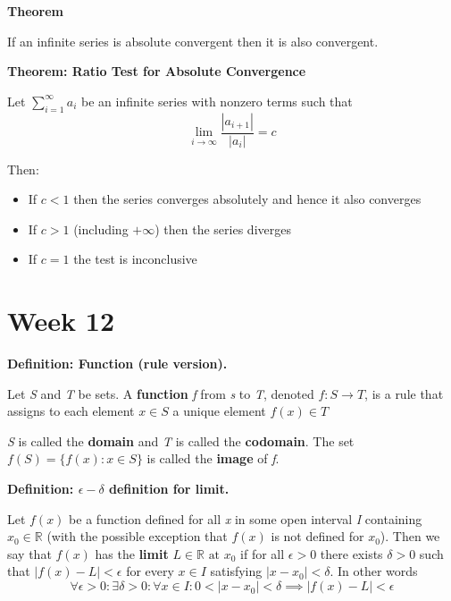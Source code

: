 \documentclass{article}
\newcommand*{\R}{\mathbb{R}}
\begin{document}
\vspace{\baselineskip}
\textbf{Theorem}

If an infinite series is absolute convergent then it is also convergent.

\vspace{\baselineskip}
\textbf{Theorem: Ratio Test for Absolute Convergence}

Let \(\sum^{\infty}_{i=1}a_i\) be an infinite series with nonzero terms such that
\begin{equation}
    \lim_{i\to\infty}\frac{|a_{i+1}|}{|a_i|} = c
\end{equation}

Then: 
\begin{itemize}
    \item If \(c < 1\) then the series converges absolutely and hence it also converges
    \item If \(c > 1\) (including \(+\infty\)) then the series diverges
    \item If \(c = 1\) the test is inconclusive
\end{itemize}

\section{Week 12}
\textbf{Definition: Function (rule version).}

Let \textit{S} and \textit{T} be sets. A \textbf{function} \textit{f} from \textit{s} to \textit{T}, denoted \(f: S \to T\), is a rule that assigns to each element \(x \in S\) a unique element \(f(x) \in T\)

\textit{S} is called the \textbf{domain} and \textit{T} is called the \textbf{codomain}. The set \(f(S) = \{f(x): x \in S\}\) is called the \textbf{image} of \textit{f}.

\vspace{\baselineskip}
\textbf{Definition: \(\epsilon - \delta\) definition for limit.}

Let \(f(x)\) be a function defined for all \textit{x} in some open interval \textit{I} containing \(x_0 \in \R\) (with the possible exception that \(f(x)\) is not defined for \(x_0\)). Then we say that \(f(x)\) has the \textbf{limit} \(L \in \R\text{ at }x_0\) if for all \(\epsilon > 0\) there exists \(\delta > 0\) such that \(|f(x) - L| < \epsilon\) for every \(x \in I\) satisfying \(|x - x_0| < \delta\). In other words
\begin{equation}
    \forall \epsilon > 0: \exists \delta > 0: \forall x \in I: 0< |x - x_0| < \delta \implies |f(x) - L| < \epsilon
\end{equation}
\end{document}
